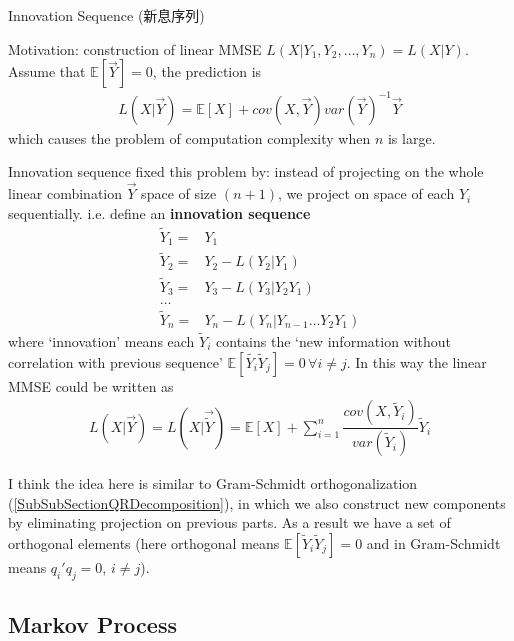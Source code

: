 \begin{point}
    Innovation Sequence (新息序列)
\end{point}

Motivation: construction of linear MMSE $ L(X|Y_1,Y_2,\ldots,Y_n)=L(X|Y) $. Assume that $\mathbb{E}\left[ \vec{Y} \right] =0 $, the prediction is
\begin{align*}
    L(X|\vec{Y})=\mathbb{E}\left[ X \right] + cov(X,\vec{Y})var(\vec{Y})^{-1}\vec{Y}
\end{align*}
which causes the problem of computation complexity when $ n $ is large. 

Innovation sequence fixed this problem by: instead of projecting on the whole linear combination $ \vec{Y} $ space of size $ (n+1) $, we project on space of each $ Y_i $ sequentially. i.e. define an \textbf{innovation sequence} 
\begin{align*}
    \tilde{Y}_1=&Y_1\\
    \tilde{Y}_2=&Y_2-L(Y_2|Y_1)\\
    \tilde{Y}_3=&Y_3-L(Y_3|Y_2Y_1)\\
    \ldots&\\
    \tilde{Y}_n=&Y_n-L(Y_n|Y_{n-1}\ldots Y_2Y_1)
\end{align*}
where `innovation' means each $ \tilde{Y}_i $ contains the `new information without correlation with previous sequence' $ \mathbb{E}\left[ \tilde{Y_i}\tilde{Y}_j \right]=0\,\forall i\neq j  $. In this way the linear MMSE could be written as
\begin{align*}
    L(X|\vec{Y})=L(X|\vec{\tilde{Y}})= \mathbb{E}\left[ X \right] +\sum_{i=1}^n \dfrac{cov(X,\tilde{Y}_i)}{var(\tilde{Y}_i)}\tilde{Y}_i
\end{align*}

I think the idea here is similar to Gram-Schmidt orthogonalization (\autoref{SubSubSectionQRDecomposition}), in which we also construct new components by eliminating projection on previous parts. As a result we have a set of orthogonal elements (here orthogonal means $ \mathbb{E}\left[ \tilde{Y}_i\tilde{Y}_j \right]=0  $ and in Gram-Schmidt means $ q_i'q_j = 0 $, $ i\neq j $).






\subsection{Markov Process}

